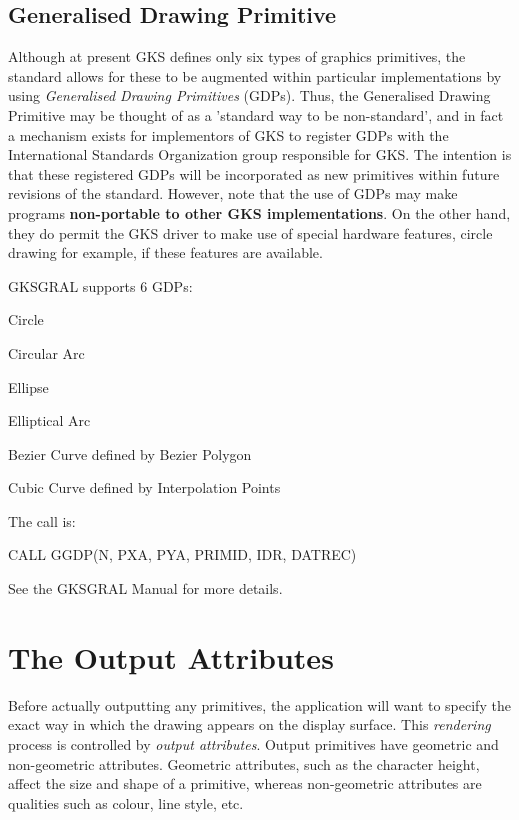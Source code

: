 \subsection{Generalised Drawing Primitive}
 
Although at present GKS defines only six types of graphics primitives,
the standard allows for these to be augmented within particular
implementations by using {\it Generalised Drawing Primitives} (GDPs).
Thus, the Generalised Drawing Primitive may be thought
of as a 'standard way to be non-standard', and in fact a mechanism
exists for implementors of GKS to register GDPs with the International
Standards Organization group responsible for GKS.
The intention is that these registered GDPs will be incorporated as new
primitives within future revisions of the standard.
However, note that the use of GDPs may make programs
{\bf non-portable to other GKS implementations}. On the other
hand, they do permit the GKS driver to make use of special hardware
features, circle drawing for example, if these features are available.
 
GKSGRAL supports 6 GDPs:
\begin{OL}
\item Circle
\item Circular Arc
\item Ellipse
\item Elliptical Arc
\item Bezier Curve defined by Bezier Polygon
\item Cubic Curve defined by Interpolation Points
\end{OL}
The call is:
\begin{XMP}
CALL GGDP(N, PXA, PYA, PRIMID, IDR, DATREC)
\end{XMP}
See the GKSGRAL Manual for more details.
\section{\protect\label{sec:attrbs}The Output Attributes}
 
Before actually outputting any primitives, the application will want to
specify the exact way in which the drawing appears on the display
surface. This {\it rendering} process is controlled
by {\it output attributes}.
Output primitives have geometric and non-geometric attributes.
Geometric attributes, such as the character height,
affect the size and shape of a primitive, whereas non-geometric
attributes are qualities such as colour, line style, etc.
 
